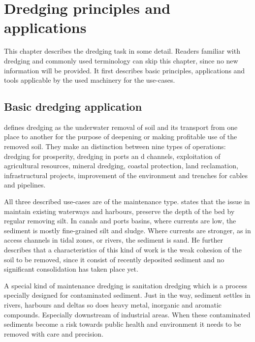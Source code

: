 \chapter{Dredging principles and applications}\label{chap:dredgingprocess}
This chapter describes the dredging task in some detail. Readers familiar with dredging and commonly used terminology can skip this chapter, since no new information will be provided. It first describes basic principles, applications and tools applicable by the used machinery for the use-cases.

\section{Basic dredging application}\label{sec:basic dredging applications}
\citet{training_institute_for_dredging_ingewijden_2008} defines dredging as the underwater removal of soil and its transport from one place to another for the purpose of deepening or making profitable use of the removed soil. They make an distinction between nine types of operations: dredging for prosperity, dredging in ports an
d channels, exploitation of agricultural resources, mineral dredging, coastal protection, land reclamation, infrastructural projects, improvement of the environment and trenches for cables and pipelines.

All three described use-cases are of the maintenance type. \citet{van_der_schrieck_dredging_2014} states that the issue in maintain existing waterways and harbours, preserve the depth of the bed by regular removing silt. In canals and ports basins, where currents are low, the sediment is mostly fine-grained silt and sludge. Where currents are stronger, as in access channels in tidal zones, or rivers, the sediment is sand. He further describes that a characteristics of this kind of work is the weak cohesion of the soil to be removed, since it consist of recently deposited sediment and no significant consolidation has taken place yet.

A special kind of maintenance dredging is sanitation dredging which is a process specially designed for contaminated sediment. Just in the way, sediment settles in rivers, harbours and deltas so does heavy metal, inorganic and aromatic compounds. Especially downstream of industrial areas. When these contaminated sediments become a risk towards public health and environment it needs to be removed with care and precision.

